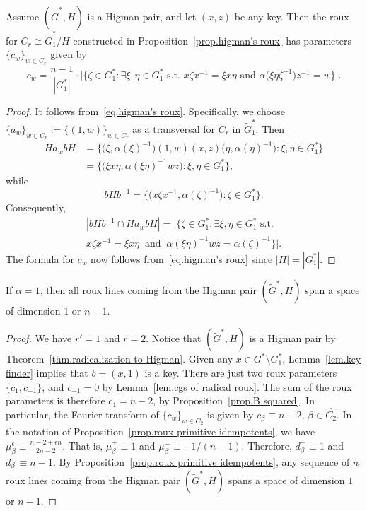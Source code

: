 \begin{lemma}
\label{lem.cgs of radical roux}
Assume $(\widetilde{G}^*,H)$ is a Higman pair, and let $(x,z)$ be any key.
Then the roux for $C_r\cong \widetilde{G}_1^*/H$ constructed in Proposition~\ref{prop.higman's roux} has parameters $\{c_{w}\}_{w\in C_r}$ given by
\[
c_{w}
=\frac{n-1}{|G^*_1|}\cdot\Big|\Big\{\zeta \in G^*_1:
\exists \xi,\eta \in G^*_1
\text{ s.t. }
x\zeta x^{-1}=\xi x\eta
\text{ and }
\alpha\bigl( \xi \eta \zeta^{-1} \bigr) z^{-1} = w
\Big\}\Big|.
\]
\end{lemma}

\begin{proof}
It follows from~\eqref{eq.higman's roux}.
Specifically, we choose $\{ a_w \}_{w \in C_r} := \{ (1,w) \}_{w \in C_r}$ as a transversal for $C_r$ in $\widetilde{G}_1^*$.
Then
\begin{align*}
H a_w b H &= \bigl\{ \bigl( \xi, \alpha(\xi)^{-1} \bigr)(1,w)(x,z)\bigl( \eta, \alpha(\eta)^{-1} \bigr) : \xi, \eta \in G_1^* \bigr\} \\
&= \bigl\{ \bigl( \xi x \eta, \alpha(\xi \eta)^{-1} wz\bigr) : \xi, \eta \in G_1^* \bigr\},
\end{align*}
while
\[ bHb^{-1} = \bigl\{ \bigl( x \zeta x^{-1}, \alpha(\zeta)^{-1} \bigr) : \zeta \in G_1^* \big\}. \]
Consequently,
\begin{multline*}
| bHb^{-1} \cap H a_w b H | = \big|\big\{\zeta \in G^*_1:
\exists \xi,\eta \in G^*_1
\text{ s.t. } \\
x \zeta x^{-1} =  \xi x \eta
\;\;
\text{and}
\;\;
\alpha(\xi \eta)^{-1}wz  = \alpha(\zeta)^{-1}
\big\}\big|.
\end{multline*}
The formula for $c_w$ now follows from~\eqref{eq.higman's roux} since $|H| = |G_1^*|$.
\end{proof}


\begin{lemma}
\label{lem.alpha=1 is dumb}
If $\alpha = 1$, then all roux lines coming from the Higman pair $(\widetilde{G}^*,H)$ span a space of dimension $1$ or $n-1$.
\end{lemma}

\begin{proof}
We have $r'=1$ and $r=2$.
Notice that $(\widetilde{G}^*,H)$ is a Higman pair by Theorem~\ref{thm.radicalization to Higman}.
Given any $x \in G^* \setminus G_1^*$, Lemma~\ref{lem.key finder} implies that $b=(x,1)$ is a key.
There are just two roux parameters $\{ c_1,c_{-1}\}$, and $c_{-1} = 0$ by Lemma~\ref{lem.cgs of radical roux}.
The sum of the roux parameters is therefore $c_1 = n-2$, by Proposition~\ref{prop.B squared}.
In particular, the Fourier transform of $\{ c_w \}_{w \in C_2}$ is given by $\hat{c}_\beta \equiv n-2$, $\beta \in\widehat{C_2}$.
In the notation of Proposition~\ref{prop.roux primitive idempotents}, we have $\mu_\beta^\epsilon \equiv \frac{n-2 + \epsilon n}{2n-2}$.
That is,  $\mu_\beta^+ \equiv 1$ and $\mu_\beta^- \equiv -1/(n-1)$.
Therefore, $d_\beta^+ \equiv 1$ and $d_\beta^- \equiv n-1$.
By Proposition~\ref{prop.roux primitive idempotents}, any sequence of $n$ roux lines coming from the Higman pair $(\widetilde{G}^*,H)$ spans a space of dimension $1$ or $n-1$.
\end{proof}


